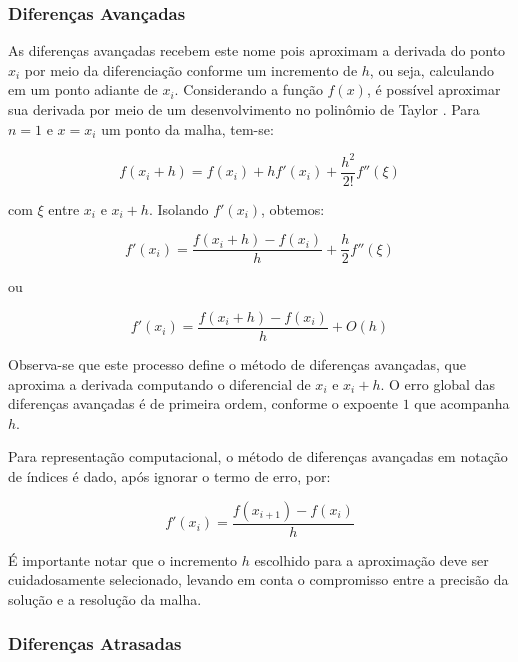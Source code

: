 \subsubsection{Diferenças Avançadas}\label{sec:difavan}

As diferenças avançadas recebem este nome pois aproximam a derivada do ponto $x_i$ por meio da diferenciação conforme um incremento de $h$, ou seja, calculando em um ponto adiante de $x_i$. Considerando a função $f(x)$, é possível aproximar sua derivada por meio de um desenvolvimento no polinômio de Taylor \cite{leveque2007finitediff}. Para $n=1$ e $x=x_i$ um ponto da malha, tem-se:

\begin{equation*}
f(x_i+h)= f(x_i)+ hf'(x_i) + \frac{h^2}{2!}f''(\xi)
\end{equation*}

com $\xi$ entre $x_i$ e $x_i + h$. Isolando $f'(x_i)$, obtemos:

\begin{equation*}
f'(x_i)= \frac{f(x_i+h)-f(x_i)}{h} + \frac{h}{2}f''(\xi)
\end{equation*}

ou

\begin{equation*}
f'(x_i)= \frac{f(x_i+h)-f(x_i)}{h} + O(h)
\end{equation*}

Observa-se que este processo define o método de diferenças avançadas, que aproxima a derivada computando o diferencial de $x_i$ e $x_i + h$. O erro global das diferenças avançadas é de primeira ordem, conforme o expoente $1$ que acompanha $h$.

Para representação computacional, o método de diferenças avançadas em notação de índices é dado, após ignorar o termo de erro, por:

\begin{equation}\label{forward_diff}
f'(x_i)= \frac{f(x_{i+1})-f(x_i)}{h}
\end{equation}

É importante notar que o incremento $h$ escolhido para a aproximação deve ser cuidadosamente selecionado, levando em conta o compromisso entre a precisão da solução e a resolução da malha.

\subsubsection{Diferenças Atrasadas}\label{sec:bw_diff}

